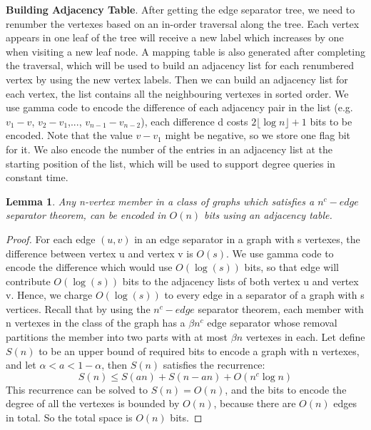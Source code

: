 \documentclass[12pt,glossary]{dalthesis}
\newtheorem{lemma}[theorem]{Lemma}
\begin{document}
\textbf{Building Adjacency Table}. After getting the edge separator tree, we need to renumber the vertexes based on an in-order traversal along the tree. Each vertex appears in one leaf of the tree will receive a new label which increases by one when visiting a new leaf node. A mapping table is also generated after completing the traversal, which will be used to build an adjacency list for each renumbered vertex by using the new vertex labels. Then we can build an adjacency list for each vertex, the list contains all the neighbouring vertexes in sorted order. We use gamma code to encode the difference of each adjacency pair in the list (e.g. $v_{1} - v$, $v_{2} - v_{1}$,..., $v_{n-1} - v_{n-2}$), each difference d costs $2\lfloor \log n \rfloor + 1$ bits to be encoded. Note that the value $v -v_{1}$ might be negative, so we store one flag bit for it. We also encode the number of the entries in an adjacency list at the starting position of the list, which will be used to support degree queries in constant time.

\bigskip
\begin{lemma}
Any n-vertex member in a class of graphs which satisfies a $n^{c}-edge$ separator
theorem, can be encoded in $O(n)$ bits using an adjacency table.
\end{lemma}


\begin{proof}
For each edge $(u, v)$ in an edge separator in a graph with s vertexes, the difference
between vertex u and vertex v is $O(s)$. We use gamma code to encode the difference which would use $O(\log (s))$ bits, so that edge will contribute $O(\log (s))$ bits to the adjacency lists of both vertex u and vertex v. Hence, we charge $O(\log (s))$ to every edge in a separator of a graph with s vertices. Recall that by using the $n^{c}- edge$ separator theorem, each member with n vertexes in the class of the graph has a $\beta n^{c}$ edge separator whose removal partitions the member into two parts with at most $\beta n$ vertexes in each. Let define $S(n)$ to be an upper bound of required bits to encode a graph with n vertexes, and let $\alpha < a < 1 - \alpha $, then $S(n)$ satisfies the recurrence:
\[ S(n) \leq S(an) + S(n-an) + O(n^{c} \log n) \]
This recurrence can be solved to $S(n) = O(n)$, and the bits to encode the degree of all the vertexes is bounded by $O(n)$, because there are $O(n)$ edges in total. So the total space is $O(n)$ bits.
\end{proof}

\bigskip
\bigskip
\end{document}
